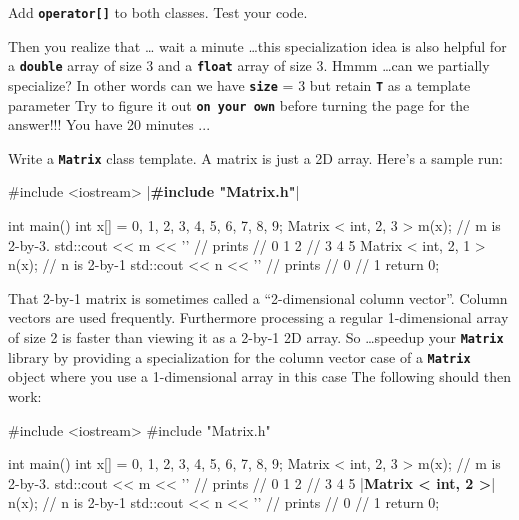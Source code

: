 \begin{ex}
Add \texttt{\textbf{operator[]}} to both classes.
Test your code.
\end{ex}
\begin{ex}
Then you realize that \ldots{} wait a minute \ldots this specialization idea is also helpful for a \texttt{\textbf{double}} array of size 3 and a \texttt{\textbf{float}} array of size 3. Hmmm \ldots can we partially specialize? In other words can we have \texttt{\textbf{size}} = 3 but retain \texttt{\textbf{T}} as a template parameter Try to figure it out \texttt{\textbf{on your own}} before turning the page for the answer!!! You have 20 minutes ...
\end{ex}
\begin{ex}
Write a \texttt{\textbf{Matrix}} class template. A matrix is just a 2D array. Here's a sample run:

\begin{consolethree}[escapeinside=||]
#include <iostream>
|\textbf{\#include "Matrix.h"}|

int main()
{    
     int x[] = {0, 1, 2, 3, 4, 5, 6, 7, 8, 9};
     Matrix < int, 2, 3 > m(x); // m is 2-by-3.
     std::cout << m << '\n' // prints
                            // 0 1 2
                            // 3 4 5
     Matrix < int, 2, 1 > n(x); // n is 2-by-1
     std::cout << n << '\n' // prints
                            // 0
                            // 1
    return 0;
} 
\end{consolethree}
\end{ex}
That 2-by-1 matrix is sometimes called a ``2-dimensional column vector''. Column vectors are used frequently. Furthermore processing a regular 1-dimensional array of size 2 is faster than viewing it as a 2-by-1 2D array. So \ldots speedup your \texttt{\textbf{Matrix}} library by providing a specialization for the column vector case of a \texttt{\textbf{Matrix}} object where you use a 1-dimensional array in this case The following should then work:

\begin{consolethree}[escapeinside=||]
#include <iostream>
#include "Matrix.h"

int main()
{    
     int x[] = {0, 1, 2, 3, 4, 5, 6, 7, 8, 9};
     Matrix < int, 2, 3 > m(x); // m is 2-by-3.
     std::cout << m << '\n' // prints
                            // 0 1 2
                            // 3 4 5
     |\textbf{Matrix < int, 2 >}| n(x); // n is 2-by-1
     std::cout << n << '\n' // prints
                            // 0
                            // 1
     return 0;
} 
\end{consolethree}

